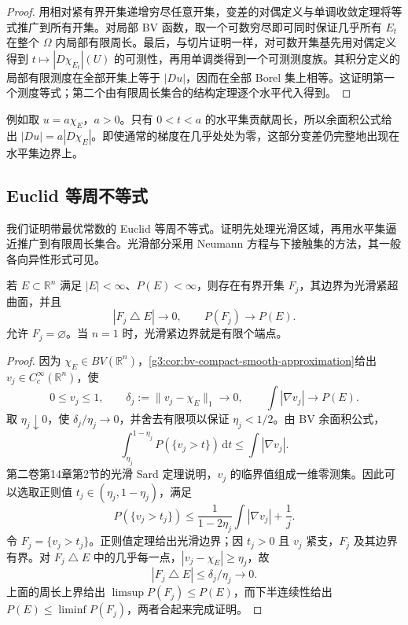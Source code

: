 \begin{proof}
	用相对紧有界开集递增穷尽任意开集，变差的对偶定义与单调收敛定理将等式推广到所有开集。对局部 BV 函数，取一个可数穷尽即可同时保证几乎所有 \(E_t\) 在整个 \(\Omega\) 内局部有限周长。最后，与切片证明一样，对可数开集基先用对偶定义得到 \(t\mapsto|D\chi_{E_t}|(U)\) 的可测性，再用单调类得到一个可测测度族。其积分定义的局部有限测度在全部开集上等于 \(|Du|\)，因而在全部 Borel 集上相等。这证明第一个测度等式；第二个由有限周长集合的结构定理逐个水平代入得到。
\end{proof}

例如取 \(u=a\chi_E\)，\(a>0\)。只有 \(0<t<a\) 的水平集贡献周长，所以余面积公式给出 \(|Du|=a|D\chi_E|\)。即使通常的梯度在几乎处处为零，这部分变差仍完整地出现在水平集边界上。

\subsection{Euclid 等周不等式}
\label{g3:subsec:2105:03}
我们证明带最优常数的 Euclid 等周不等式。证明先处理光滑区域，再用水平集逼近推广到有限周长集合。光滑部分采用 Neumann 方程与下接触集的方法，其一般各向异性形式可见\cite[第4节，第2986--2988页]{CabreRosOtonSerra2016ABP}。

\begin{lemma}\label{g3:lem:smooth-set-perimeter-approximation}
	若 \(E\subset\mathbb R^n\) 满足 \(|E|<\infty\)、\(P(E)<\infty\)，则存在有界开集 \(F_j\)，其边界为光滑紧超曲面，并且
	\[
		|F_j\mathbin{\triangle}E|\longrightarrow0,
		\qquad P(F_j)\longrightarrow P(E).
	\]
	允许 \(F_j=\varnothing\)。当 \(n=1\) 时，光滑紧边界就是有限个端点。
\end{lemma}
\begin{proof}
	因为 \(\chi_E\in BV(\mathbb R^n)\)，\cref{g3:cor:bv-compact-smooth-approximation}给出 \(v_j\in C_c^\infty(\mathbb R^n)\)，使
	\[
		0\le v_j\le1,\qquad \delta_j:=\|v_j-\chi_E\|_1\to0,
		\qquad \int|\nabla v_j|\to P(E).
	\]
	取 \(\eta_j\downarrow0\)，使 \(\delta_j/\eta_j\to0\)，并舍去有限项以保证 \(\eta_j<1/2\)。由 BV 余面积公式，
	\[
		\int_{\eta_j}^{1-\eta_j}P(\{v_j>t\})\,\mathrm dt\le\int|\nabla v_j|.
	\]
	第二卷第14章第2节的光滑 Sard 定理说明，\(v_j\) 的临界值组成一维零测集。因此可以选取正则值 \(t_j\in(\eta_j,1-\eta_j)\)，满足
	\[
		P(\{v_j>t_j\})\le\frac1{1-2\eta_j}\int|\nabla v_j|+\frac1j.
	\]
	令 \(F_j=\{v_j>t_j\}\)。正则值定理给出光滑边界；因 \(t_j>0\) 且 \(v_j\) 紧支，\(F_j\) 及其边界有界。对 \(F_j\mathbin{\triangle}E\) 中的几乎每一点，\(|v_j-\chi_E|\ge\eta_j\)，故
	\[
		|F_j\mathbin{\triangle}E|\le\delta_j/\eta_j\longrightarrow0.
	\]
	上面的周长上界给出 \(\limsup P(F_j)\le P(E)\)，而下半连续性给出 \(P(E)\le\liminf P(F_j)\)，两者合起来完成证明。
\end{proof}

